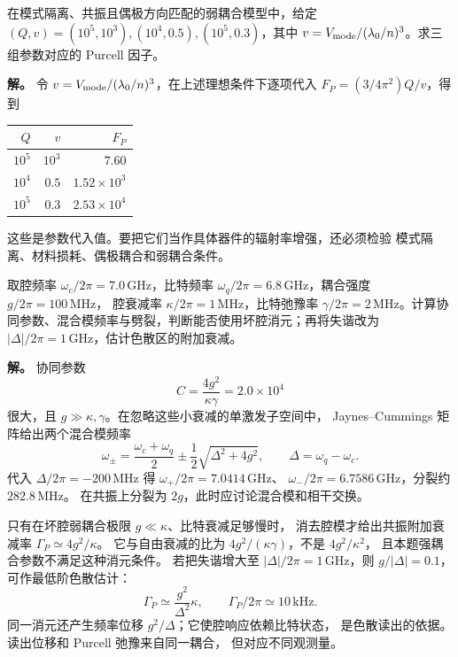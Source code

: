 \begin{example}[腔品质因子与模式体积的数量级]
在模式隔离、共振且偶极方向匹配的弱耦合模型中，给定 $(Q,v)=(10^5,10^3),(10^4,0.5),(10^5,0.3)$，其中 $v=V_{\rm mode}/(\lambda_0/n)^3$。求三组参数对应的 Purcell 因子。

\textbf{解。} 令 $v=V_{\rm mode}/(\lambda_0/n)^3$，在上述理想条件下逐项代入
$F_P=(3/4\pi^2)Q/v$，得到
\begin{center}
\begin{tabular}{rrr}
\hline
$Q$ & $v$ & $F_P$ \\
\hline
$10^5$ & $10^3$ & $7.60$ \\
$10^4$ & $0.5$ & $1.52\times10^3$ \\
$10^5$ & $0.3$ & $2.53\times10^4$ \\
\hline
\end{tabular}
\end{center}
这些是参数代入值。要把它们当作具体器件的辐射率增强，还必须检验
模式隔离、材料损耗、偶极耦合和弱耦合条件。
\end{example}

\begin{example}
取腔频率 $\omega_c/2\pi=7.0\,\mathrm{GHz}$，比特频率
$\omega_q/2\pi=6.8\,\mathrm{GHz}$，耦合强度 $g/2\pi=100\,\mathrm{MHz}$，
腔衰减率 $\kappa/2\pi=1\,\mathrm{MHz}$，比特弛豫率
$\gamma/2\pi=2\,\mathrm{MHz}$。计算协同参数、混合模频率与劈裂，判断能否使用坏腔消元；再将失谐改为 $|\Delta|/2\pi=1\,\mathrm{GHz}$，估计色散区的附加衰减。

\textbf{解。} 协同参数
\[
C=\frac{4g^2}{\kappa\gamma}=2.0\times10^4
\]
很大，且 $g\gg\kappa,\gamma$。在忽略这些小衰减的单激发子空间中，
Jaynes--Cummings 矩阵给出两个混合模频率
\[
\omega_\pm=\frac{\omega_c+\omega_q}{2}
\pm\frac12\sqrt{\Delta^2+4g^2},\qquad \Delta=\omega_q-\omega_c.
\]
代入 $\Delta/2\pi=-200\,\mathrm{MHz}$ 得
$\omega_+/2\pi=7.0414\,\mathrm{GHz}$、
$\omega_-/2\pi=6.7586\,\mathrm{GHz}$，分裂约 $282.8\,\mathrm{MHz}$。
在共振上分裂为 $2g$，此时应讨论混合模和相干交换。

只有在坏腔弱耦合极限 $g\ll\kappa$、比特衰减足够慢时，
消去腔模才给出共振附加衰减率 $\Gamma_P\simeq4g^2/\kappa$。
它与自由衰减的比为 $4g^2/(\kappa\gamma)$，不是 $4g^2/\kappa^2$，
且本题强耦合参数不满足这种消元条件。
若把失谐增大至 $|\Delta|/2\pi=1\,\mathrm{GHz}$，则 $g/|\Delta|=0.1$，
可作最低阶色散估计：
\[
\Gamma_P\simeq\frac{g^2}{\Delta^2}\kappa,
\qquad \Gamma_P/2\pi\simeq10\,\mathrm{kHz}.
\]
同一消元还产生频率位移 $g^2/\Delta$；它使腔响应依赖比特状态，
是色散读出的依据。读出位移和 Purcell 弛豫来自同一耦合，
但对应不同观测量。
\end{example}

